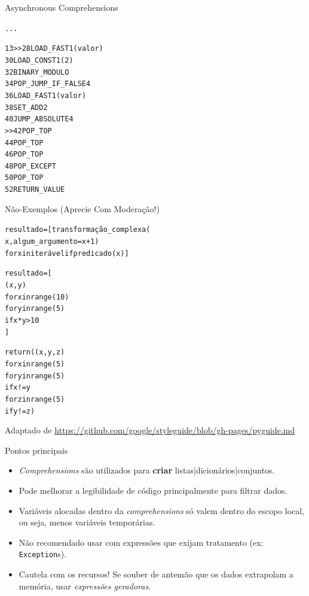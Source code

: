 \documentclass[11pt]{beamer}
\begin{document}
\begin{frame}[fragile]{Asynchronous Comprehensions}
\vspace*{-.25cm}
  \begin{alltt}\tiny
...


 13     >>   28 LOAD_FAST                1 (valor)
             30 LOAD_CONST               1 (2)
             32 BINARY_MODULO
             34 POP_JUMP_IF_FALSE        4
             36 LOAD_FAST                1 (valor)
             38 SET_ADD                  2
             40 JUMP_ABSOLUTE            4
        >>   42 POP_TOP
             44 POP_TOP
             46 POP_TOP
             48 POP_EXCEPT
             50 POP_TOP
             52 RETURN_VALUE
\end{alltt}
\end{frame}


\begin{frame}[fragile]{Não-Exemplos (Aprecie Com Moderação!)}
  \begin{flushright}
  \begin{alltt}\scriptsize
  resultado = [transformação_complexa(
                x, algum_argumento=x+1)
               for x in iterável if predicado(x)]

  resultado = [
      (x, y)
      for x in range(10)
      for y in range(5)
      if x * y > 10
  ]

  return ((x, y, z)
          for x in range(5)
          for y in range(5)
          if x != y
          for z in range(5)
          if y != z)
\end{alltt}

  \tiny{\vspace*{.25cm}
    Adaptado de \url{https://github.com/google/styleguide/blob/gh-pages/pyguide.md}}
  \end{flushright}
\end{frame}

\begin{frame}[fragile]{Pontos principais}
  \begin{itemize}
    \item \emph{Comprehensions} são utilizados para \textbf{criar} listas|dicionários|conjuntos.
    \item Pode melhorar a legibilidade de código principalmente para filtrar dados.
    \item Variáveis alocadas dentro da \emph{comprehensions} só valem dentro do escopo local, ou seja, menos variáveis temporárias.
    \item Não recomendado usar com expressões que exijam tratamento (ex: \texttt{Exception}s).
    \item Cautela com os recursos! Se souber de antemão que os dados extrapolam a memória, usar \emph{expressões geradoras}.
  \end{itemize}
\end{frame}
\end{document}
